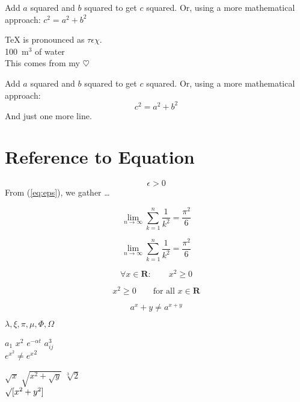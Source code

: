 \documentclass[a4paper,11pt,twocolumn]{article}
\begin{document}
\begin{spacing}{1.0}
\setlength{\parskip}{2em} 

Add $a$ squared and $b$ squared
to get $c$ squared. Or, using
a more mathematical approach:
$c^{2}=a^{2}+b^{2}$

\TeX{} is pronounced as
$\tau\epsilon\chi$.\\[6pt]
100~m$^{3}$ of water\\[6pt]
This comes from my $\heartsuit$

Add $a$ squared and $b$ squared
to get $c$ squared. Or, using
a more mathematical approach:
\begin{displaymath}
c^{2}=a^{2}+b^{2}
\end{displaymath}
And just one more line.

\section{Reference to Equation}
\begin{equation} \label{eq:eps}
\epsilon > 0
\end{equation}
From (\ref{eq:eps}), we gather
\ldots

\begin{displaymath}
\lim_{n \to \infty}
\sum_{k=1}^n \frac{1}{k^2}
= \frac{\pi^2}{6}
\end{displaymath}

\begin{displaymath}
\lim_{n \to \infty}
\sum_{k=1}^n \frac{1}{k^2}
= \frac{\pi^2}{6}
\end{displaymath}

\begin{equation}
\forall x \in \mathbf{R}:
\qquad x^{2} \geq 0
\end{equation}

\begin{equation}
x^{2} \geq 0\qquad
\textrm{for all }x\in\mathbf{R}
\end{equation}

\begin{equation}
a^x+y \neq a^{x+y}
\end{equation}

$\lambda,\xi,\pi,\mu,\Phi,\Omega$ 

$a_{1}$ \qquad $x^{2}$ \qquad
$e^{-\alpha t}$ \qquad
$a^{3}_{ij}$\\
$e^{x^2} \neq {e^x}^2$

$\sqrt{x}$ \qquad
$\sqrt{ x^{2}+\sqrt{y} }$
\qquad $\sqrt[3]{2}$\\[3pt]
$\surd[x^2 + y^2]$


\end{spacing}
\end{document}
